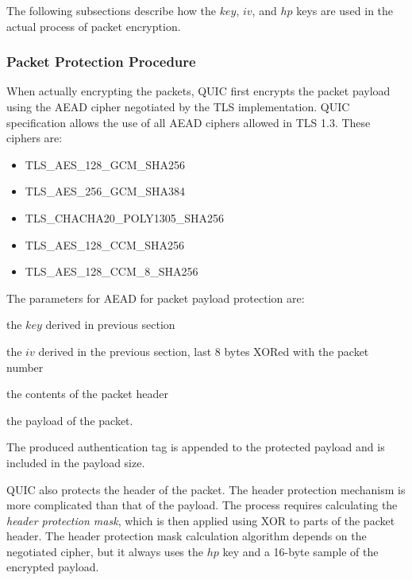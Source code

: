 The following subsections describe how the $key$, $iv$, and $hp$ keys are used in the actual process
of packet encryption.

\subsubsection{Packet Protection Procedure}

When actually encrypting the packets, QUIC first encrypts the packet payload using the AEAD cipher
negotiated by the TLS implementation. QUIC specification allows the use of all AEAD ciphers allowed
in TLS 1.3. These ciphers are:

\begin{itemize}

  \item TLS\_AES\_128\_GCM\_SHA256

  \item TLS\_AES\_256\_GCM\_SHA384

  \item TLS\_CHACHA20\_POLY1305\_SHA256

  \item TLS\_AES\_128\_CCM\_SHA256

  \item TLS\_AES\_128\_CCM\_8\_SHA256

\end{itemize}


The parameters for AEAD for packet payload protection are:

\begin{itemize}

     the $key$ derived in previous section

     the $iv$ derived in the previous section, last 8 bytes XORed with the packet
number

     the contents of the packet header

     the payload of the packet.

\end{itemize}

The produced authentication tag is appended to the protected payload and is included in the payload
size.

QUIC also protects the header of the packet. The header protection mechanism is more complicated
than that of the payload. The process requires calculating the \textit{header protection mask},
which is then applied using XOR to parts of the packet header. The header protection mask
calculation algorithm depends on the negotiated cipher, but it always uses the $hp$ key and a
16-byte sample of the encrypted payload.

